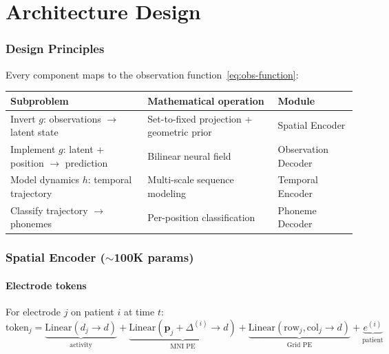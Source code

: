 \documentclass[11pt,letterpaper]{article}
\newcommand{\bfp}{\mathbf{p}}
\begin{document}

\part{Architecture Design}

\section{Design Principles}

Every component maps to the observation function~\eqref{eq:obs-function}:

\begin{table}[ht]\centering\small
\begin{tabular}{@{}lll@{}}
\toprule
\textbf{Subproblem} & \textbf{Mathematical operation} & \textbf{Module} \\
\midrule
Invert $g$: observations $\to$ latent state & Set-to-fixed projection + geometric prior & Spatial Encoder \\
Implement $g$: latent + position $\to$ prediction & Bilinear neural field & Observation Decoder \\
Model dynamics $h$: temporal trajectory & Multi-scale sequence modeling & Temporal Encoder \\
Classify trajectory $\to$ phonemes & Per-position classification & Phoneme Decoder \\
\bottomrule
\end{tabular}
\end{table}


\section{Spatial Encoder (${\sim}$100K params)}

\subsection{Electrode tokens}

For electrode $j$ on patient $i$ at time $t$:
\begin{equation}
\text{token}_j = \underbrace{\text{Linear}(d_j \to d)}_{\text{activity}} + \underbrace{\text{Linear}(\bfp_j + \Delta^{(i)} \to d)}_{\text{MNI PE}} + \underbrace{\text{Linear}(\text{row}_j, \text{col}_j \to d)}_{\text{Grid PE}} + \underbrace{e^{(i)}}_{\text{patient}}
\end{equation}
\end{document}
